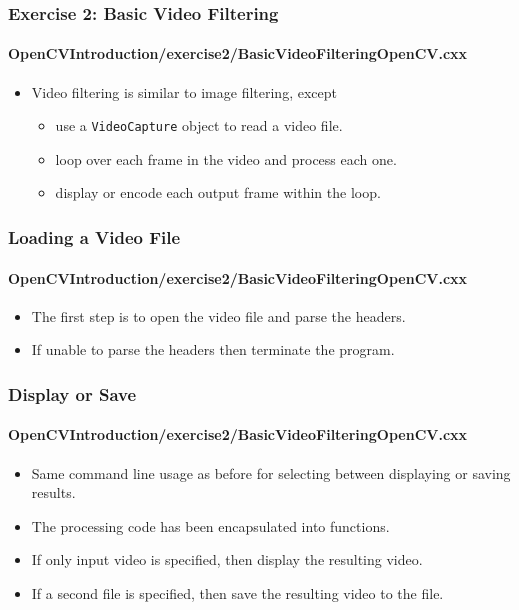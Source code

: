 \begin{frame}
\frametitle{Exercise 2: Basic Video Filtering}
\framesubtitle{OpenCVIntroduction/exercise2/BasicVideoFilteringOpenCV.cxx}
\begin{center}
\begin{itemize}
\item Video filtering is similar to image filtering, except
  \begin{itemize}
  \item use a {\tt VideoCapture} object to read a video file.
  \item loop over each frame in the video and process each one.
  \item display or encode each output frame within the loop.
  \end{itemize}
\end{itemize}
\end{center}
\end{frame}


\begin{frame}
\frametitle{Loading a Video File}
\framesubtitle{OpenCVIntroduction/exercise2/BasicVideoFilteringOpenCV.cxx}
\begin{center}
\begin{itemize}
\item The first step is to open the video file and parse the headers.
\item If unable to parse the headers then terminate the program.
\end{itemize}
\end{center}
\end{frame}


\begin{frame}
\frametitle{Display or Save}
\framesubtitle{OpenCVIntroduction/exercise2/BasicVideoFilteringOpenCV.cxx}
\begin{center}
\begin{itemize}
\item Same command line usage as before for selecting between displaying
      or saving results.
\item The processing code has been encapsulated into functions.
\item If only input video is specified, then display the resulting video.
\item If a second file is specified, then save the resulting video to the file.
\end{itemize}
\end{center}
\end{frame}


